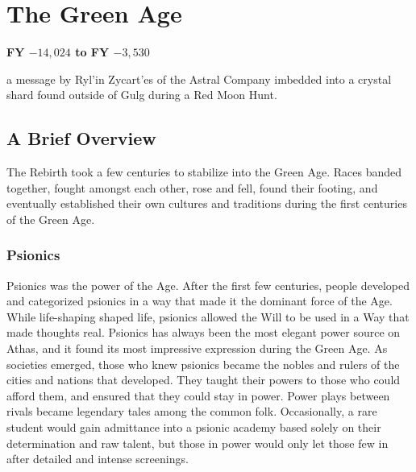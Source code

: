 \section{The Green Age}
\textbf{FY $-14,024$ to FY $-3,530$}

{a message by Ryl'in Zycart'es of the Astral Company imbedded into a crystal shard found outside of Gulg during a Red Moon Hunt.}

\subsection{A Brief Overview}
The Rebirth took a few centuries to stabilize into the Green Age. Races banded together, fought amongst each other, rose and fell, found their footing, and eventually established their own cultures and traditions during the first centuries of the Green Age.

\subsubsection{Psionics}
Psionics was the power of the Age. After the first few centuries, people developed and categorized psionics in a way that made it the dominant force of the Age. While life-shaping shaped life, psionics allowed the Will to be used in a Way that made thoughts real. Psionics has always been the most elegant power source on Athas, and it found its most impressive expression during the Green Age. As societies emerged, those who knew psionics became the nobles and rulers of the cities and nations that developed. They taught their powers to those who could afford them, and ensured that they could stay in power. Power plays between rivals became legendary tales among the common folk. Occasionally, a rare student would gain admittance into a psionic academy based solely on their determination and raw talent, but those in power would only let those few in after detailed and intense screenings.

